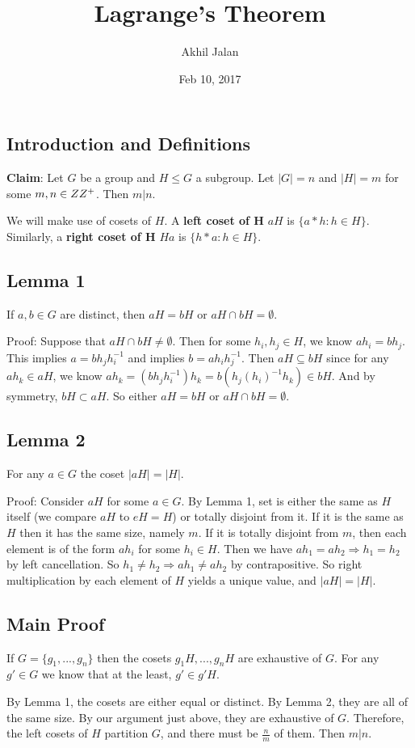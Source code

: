 \documentclass[letterpaper]{article} %
\newcommand{\absl}{\left|}
\newcommand{\absr}{\right|}
\newcommand{\prob}{\subsection*}
\newcommand{\rarr}{\Rightarrow}
\begin{document}
\title{Lagrange's Theorem}
\author{Akhil Jalan}
\date{Feb 10, 2017}
\maketitle


\prob{Introduction and Definitions} 

\textbf{Claim}: Let $G$ be a group and $H \leq G$ a subgroup. Let $\absl G \absr = n$ and $\absl H \absr = m$ for some $m, n \in \\ZZ^{+}$. Then $m | n$. 

We will make use of cosets of $H$. A \textbf{left coset of H} $aH$ is $\{a * h: h \in H\}$. Similarly, a \textbf{right coset of H} $Ha$ is $\{h * a: h \in H\}$. 

\prob{Lemma 1} 

If $a, b \in G$ are distinct, then $aH = bH$ or $aH \cap bH = \emptyset$. 

Proof: Suppose that $aH \cap bH \neq \emptyset$. Then for some $h_i, h_j \in H$, we know $ah_i = bh_j$. This implies $a = bh_{j}h_{i}^{-1}$ and implies $b = ah_{i}h_{j}^{-1}$. Then $aH \subseteq bH$ since for any $ah_k \in aH$, we know $ah_k = (bh_{j}h_{i}^{-1})h_k = b(h_{j}(h_{i})^{-1}h_k) \in bH$. And by symmetry, $bH \subset aH$. So either $aH = bH$ or $aH \cap bH = \emptyset$. 

\prob{Lemma 2} 

For any $a \in G$ the coset $\absl aH \absr = \absl H \absr$. 

Proof: Consider $aH$ for some $a \in G$. By Lemma 1, set is either the same as $H$ itself (we compare $aH$ to $eH = H$) or totally disjoint from it. If it is the same as $H$ then it has the same size, namely $m$. If it is totally disjoint from $m$, then each element is of the form $ah_{i}$ for some $h_i \in H$. Then we have $ah_{1} = ah_{2} \rarr h_1 = h_2$ by left cancellation. So $h_1 \neq h_2 \rarr ah_1 \neq ah_2$ by contrapositive. So right multiplication by each element of $H$ yields a unique value, and $\absl aH \absr = \absl H \absr$.

\prob{Main Proof} 

If $G = \{g_1, ..., g_n\}$ then the cosets $g_{1}H, ..., g_{n}H$ are exhaustive of $G$. For any $g' \in G$ we know that at the least, $g' \in g'H$. 

By Lemma 1, the cosets are either equal or distinct. By Lemma 2, they are all of the same size. By our argument just above, they are exhaustive of $G$. Therefore, the left cosets of $H$ partition $G$, and there must be $\frac{n}{m}$ of them. Then $m | n$. 
\end{document}
